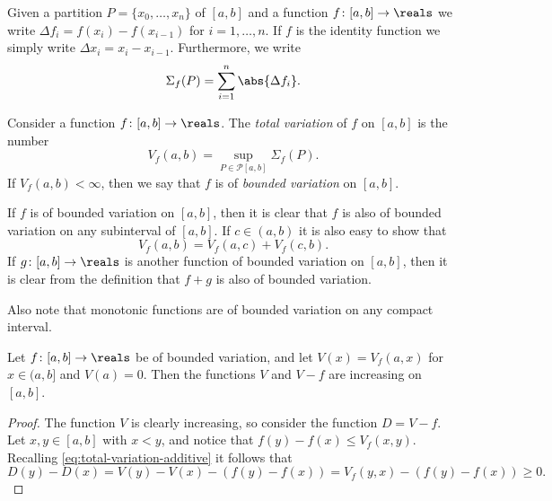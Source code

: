 \documentclass[article, a4paper, 11pt, oneside]{memoir}
\numberwithin{equation}{chapter}
\newcommand{\calP}{\mathcal{P}}
\begin{document}
Given a partition $P = \{x_0, \ldots, x_n \}$ of $[a,b]$ and a function $f \colon [a,b] \to \reals$ we write $\Delta f_i = f(x_i) - f(x_{i-1})$ for $i = 1, \ldots, n$. If $f$ is the identity function we simply write $\Delta x_i = x_i - x_{i-1}$. Furthermore, we write
%
\begin{equation*}
    \Sigma_f(P)
        = \sum_{i=1}^n \abs{\Delta f_i}.
\end{equation*}

\begin{definition}
    Consider a function $f \colon [a,b] \to \reals$. The \emph{total variation} of $f$ on $[a,b]$ is the number
    \begin{equation*}
        V_f(a,b)
            = \sup_{P \in \calP[a,b]} \Sigma_f(P).
    \end{equation*}
    If $V_f(a,b) < \infty$, then we say that $f$ is of \emph{bounded variation} on $[a,b]$.
\end{definition}
%
If $f$ is of bounded variation on $[a,b]$, then it is clear that $f$ is also of bounded variation on any subinterval of $[a,b]$. If $c \in (a,b)$ it is also easy to show that
%
\begin{equation}
    \label{eq:total-variation-additive}
    V_f(a,b)
        = V_f(a,c) + V_f(c,b).
\end{equation}
%
If $g \colon [a,b] \to \reals$ is another function of bounded variation on $[a,b]$, then it is clear from the definition that $f + g$ is also of bounded variation.

Also note that monotonic functions are of bounded variation on any compact interval.

\begin{lemma}
    Let $f \colon [a,b] \to \reals$ be of bounded variation, and let $V(x) = V_f(a,x)$ for $x \in (a, b]$ and $V(a) = 0$. Then the functions $V$ and $V - f$ are increasing on $[a,b]$.
\end{lemma}

\begin{proof}
    The function $V$ is clearly increasing, so consider the function $D = V-f$. Let $x,y \in [a,b]$ with $x < y$, and notice that $f(y) - f(x) \leq V_f(x,y)$. Recalling \cref{eq:total-variation-additive} it follows that
    \begin{equation*}
        D(y) - D(x)
            = V(y) - V(x) - (f(y) - f(x))
            = V_f(y,x) - (f(y) - f(x))
            \geq 0.
    \end{equation*}
\end{proof}
\end{document}
